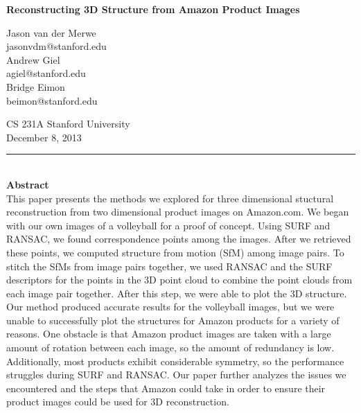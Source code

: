 \documentclass[12pt]{article}
\begin{document}
\begin{center}

{\Large \textbf{Reconstructing 3D Structure from Amazon Product Images}}

\begin{multicols}{3}
Jason van der Merwe\\
jasonvdm@stanford.edu\\
\columnbreak
Andrew Giel\\
agiel@stanford.edu\\
\columnbreak
Bridge Eimon\\
beimon@stanford.edu\\
\end{multicols}
CS 231A Stanford University\\
December 8, 2013\\
\end{center}
\noindent\rule{16.5cm}{0.4pt}\\
{\large \textbf{Abstract}}\\
This paper presents the methods we explored for three dimensional stuctural reconstruction from two dimensional product images on Amazon.com. We began with our own images of a volleyball for a proof of concept. Using SURF and RANSAC, we found correspondence points among the images. After we retrieved these points, we computed structure from motion (SfM) among image pairs. To stitch the SfMs from image pairs together, we used RANSAC and the SURF descriptors for the points in the 3D point cloud to combine the point clouds from each image pair together. After this step, we were able to plot the 3D structure. Our method produced accurate results for the volleyball images, but we were unable to successfully plot the structures for Amazon products for a variety of reasons. One obstacle is that Amazon product images are taken with a large amount of rotation between each image, so the amount of redundancy is low. Additionally, most products exhibit considerable symmetry, so the performance struggles during SURF and RANSAC. Our paper further analyzes the issues we encountered and the steps that Amazon could take in order to ensure their product images could be used for 3D reconstruction.\\
\end{document}
